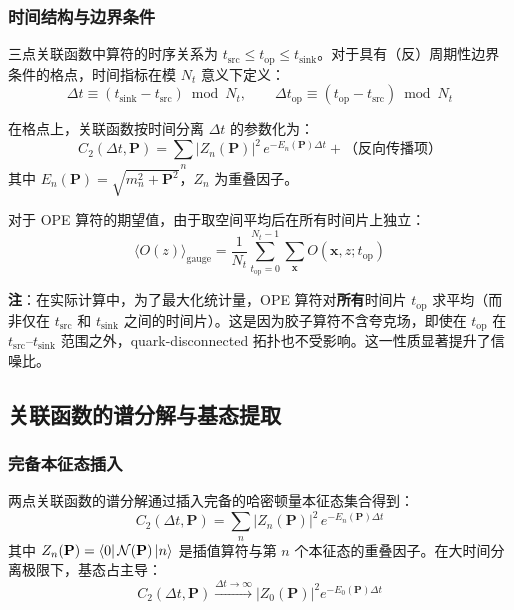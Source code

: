 \documentclass[11pt,a4paper]{ctexart}
\begin{document}
\subsubsection{时间结构与边界条件}

三点关联函数中算符的时序关系为 $t_{\text{src}} \le t_{\text{op}} \le t_{\text{sink}}$。对于具有（反）周期性边界条件的格点，时间指标在模 $N_t$ 意义下定义：
\begin{equation}
\Delta t \equiv (t_{\text{sink}} - t_{\text{src}}) \bmod N_t, \qquad
\Delta t_{\text{op}} \equiv (t_{\text{op}} - t_{\text{src}}) \bmod N_t
\end{equation}

在格点上，关联函数按时间分离 $\Delta t$ 的参数化为：
\begin{equation}\label{eq:C2_param}
C_2(\Delta t, \mathbf{P}) = \sum_n |Z_n(\mathbf{P})|^2 \,
e^{-E_n(\mathbf{P}) \Delta t} + \text{（反向传播项）}
\end{equation}
其中 $E_n(\mathbf{P}) = \sqrt{m_n^2 + \mathbf{P}^2}$，$Z_n$ 为重叠因子。

对于 OPE 算符的期望值，由于取空间平均后在所有时间片上独立：
\begin{equation}
\langle O(z) \rangle_{\text{gauge}} = \frac{1}{N_t}
\sum_{t_{\text{op}}=0}^{N_t-1} \sum_{\mathbf{x}} O(\mathbf{x}, z; t_{\text{op}})
\end{equation}

\textbf{注}：在实际计算中，为了最大化统计量，OPE 算符对\textbf{所有}时间片 $t_{\text{op}}$ 求平均（而非仅在 $t_{\text{src}}$ 和 $t_{\text{sink}}$ 之间的时间片）。这是因为胶子算符不含夸克场，即使在 $t_{\text{op}}$ 在 $t_{\text{src}} \text{--} t_{\text{sink}}$ 范围之外，quark-disconnected 拓扑也不受影响。这一性质显著提升了信噪比。

\subsection{关联函数的谱分解与基态提取}

\subsubsection{完备本征态插入}

两点关联函数的谱分解通过插入完备的哈密顿量本征态集合得到：
\begin{equation}\label{eq:C2_spectral}
C_2(\Delta t, \mathbf{P}) = \sum_n |Z_n(\mathbf{P})|^2 \, e^{-E_n(\mathbf{P}) \Delta t}
\end{equation}
其中 $Z_n(\mathbf{P}) = \bra{0} \mathcal{N}(\mathbf{P}) \ket{n}$ 是插值算符与第 $n$ 个本征态的重叠因子。在大时间分离极限下，基态占主导：
\begin{equation}
C_2(\Delta t, \mathbf{P}) \xrightarrow{\Delta t \to \infty} |Z_0(\mathbf{P})|^2 e^{-E_0(\mathbf{P}) \Delta t}
\end{equation}
\end{document}
